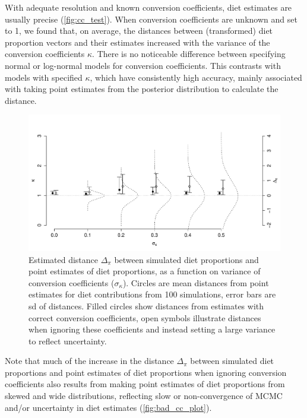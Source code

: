 \documentclass[12pt]{article}
\begin{document}
With adequate resolution and known conversion coefficients, diet
estimates are usually precise (\autoref{fig:cc_test}). When conversion
coefficients are unknown and set to 1, we found that, on average, the
distances between (transformed) diet proportion vectors and their
estimates increased with the variance of the conversion coefficients
$\kappa$. There is no noticeable difference between specifying normal
or log-normal models for conversion coefficients. This contrasts with
models with specified $\kappa$, which have consistently high accuracy, mainly associated with taking point estimates from the posterior distribution to calculate the distance.


\begin{figure}[H]
  \begin{center}    
      \includegraphics[width=1\textwidth]{figures/CC_error.pdf}  
       \caption{Estimated distance $\Delta_\pi$ between simulated diet
         proportions and point estimates of diet proportions, as a function on variance of
         conversion coefficients ($\sigma_\kappa$). Circles are mean distances from point
         estimates for diet contributions from 100
         simulations, error bars are sd of distances. Filled circles show distances from estimates with correct conversion coefficients, open symbols illustrate distances when ignoring these coefficients and instead setting a large variance to reflect uncertainty.}
\label{fig:cc_test}
\end{center}
\end{figure}


Note that much of the increase in the distance $\Delta_\pi$ between simulated diet
         proportions and point estimates of diet proportions when
ignoring conversion coefficients also results from making point
estimates of diet proportions from skewed and wide distributions,
reflecting slow or non-convergence of MCMC and/or uncertainty in diet
estimates (\autoref{fig:bad_cc_plot}).
\end{document}
